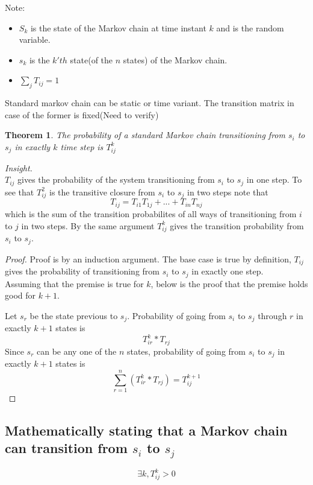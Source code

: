 \documentclass[12pt]{article}
\newtheorem{thm}{Theorem}
\begin{document}
Note:
\begin{itemize}
\item $S_k$ is the state of the Markov chain at time instant $k$ and is the random variable.
\item $s_k$ is the $k'th$ state(of the $n$ states) of the Markov chain.
\item $\sum_j T_{ij} = 1$
\end{itemize}


\noindent
Standard markov chain can be static or time variant. The transition matrix in case of the former is fixed(Need to verify)

\begin{thm}
The probability of a standard Markov chain transitioning from $s_i$ to $s_j$ in exactly $k$ time step is $T_{ij}^k$
\end{thm}
\noindent \emph {Insight.} \\
\noindent $T_{ij}$ gives the probability of the system transitioning from $s_i$ to $s_j$ in one step.
To see that $T_{ij}^2$ is the transitive closure from $s_i$ to $s_j$ in two steps note that
$$T_{ij} = T_{i1}T_{1j} + ... + T_{in}T_{nj}$$
which is the sum of the transition probabilites of all ways of transitioning from $i$ to $j$ in two steps.
By the same argument $T_{ij}^k$ gives the transition probability from $s_i$ to $s_j$.
\begin{proof}
Proof is by an induction argument. The base case is true by definition, $T_{ij}$ gives the probability of transitioning from $s_i$ to $s_j$ in exactly one step.\\

\noindent Assuming that the premise is true for $k$, below is the proof that the premise holds good for $k + 1$.

\noindent Let $s_r$ be the state previous to $s_j$. Probability of going from $s_i$ to $s_j$ through $r$ in exactly $k + 1$ states is 
$$T_{ir}^k * T_{rj}$$
Since $s_r$ can be any one of the $n$ states, probability of going from $s_i$ to $s_j$ in exactly $k + 1$ states is
$$\sum_{r = 1}^n (T_{ir}^k * T_{rj}) = T_{ij}^{k + 1}$$
\end{proof}

\subsection{Mathematically stating that a Markov chain can transition from $s_i$ to $s_j$}
$$\exists k, T_{ij}^k > 0$$
\end{document}
